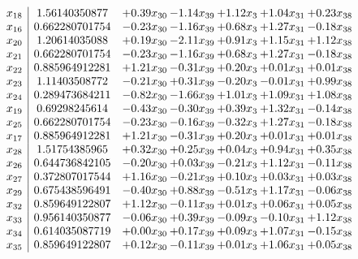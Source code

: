 \documentclass[8pt]{article}
\begin{document}
\[\begin{array}{c| c c@{\hskip 2pt} c@{\hskip 2pt} c@{\hskip 2pt} c@{\hskip 2pt} c@{\hskip 2pt} }
 x_{18}   &  1.56140350877 & +  0.39 x_{30} & -1.14 x_{39} & +  1.12 x_{3} & +  1.04 x_{31} & +  0.23 x_{38}\\
 x_{16}   &  0.662280701754 & -0.23 x_{30} & -1.16 x_{39} & +  0.68 x_{3} & +  1.27 x_{31} & -0.18 x_{38}\\
 x_{20}   &  1.20614035088 & +  0.19 x_{30} & -2.11 x_{39} & +  0.91 x_{3} & +  1.15 x_{31} & +  1.12 x_{38}\\
 x_{21}   &  0.662280701754 & -0.23 x_{30} & -1.16 x_{39} & +  0.68 x_{3} & +  1.27 x_{31} & -0.18 x_{38}\\
 x_{22}   &  0.885964912281 & +  1.21 x_{30} & -0.31 x_{39} & +  0.20 x_{3} & +  0.01 x_{31} & +  0.01 x_{38}\\
 x_{23}   &  1.11403508772 & -0.21 x_{30} & +  0.31 x_{39} & -0.20 x_{3} & -0.01 x_{31} & +  0.99 x_{38}\\
 x_{24}   &  0.289473684211 & -0.82 x_{30} & -1.66 x_{39} & +  1.01 x_{3} & +  1.09 x_{31} & +  1.08 x_{38}\\
 x_{19}   &  0.69298245614 & -0.43 x_{30} & -0.30 x_{39} & +  0.39 x_{3} & +  1.32 x_{31} & -0.14 x_{38}\\
 x_{25}   &  0.662280701754 & -0.23 x_{30} & -0.16 x_{39} & -0.32 x_{3} & +  1.27 x_{31} & -0.18 x_{38}\\
 x_{17}   &  0.885964912281 & +  1.21 x_{30} & -0.31 x_{39} & +  0.20 x_{3} & +  0.01 x_{31} & +  0.01 x_{38}\\
 x_{28}   &  1.51754385965 & +  0.32 x_{30} & +  0.25 x_{39} & +  0.04 x_{3} & +  0.94 x_{31} & +  0.35 x_{38}\\
 x_{26}   &  0.644736842105 & -0.20 x_{30} & +  0.03 x_{39} & -0.21 x_{3} & +  1.12 x_{31} & -0.11 x_{38}\\
 x_{27}   &  0.372807017544 & +  1.16 x_{30} & -0.21 x_{39} & +  0.10 x_{3} & +  0.03 x_{31} & +  0.03 x_{38}\\
 x_{29}   &  0.675438596491 & -0.40 x_{30} & +  0.88 x_{39} & -0.51 x_{3} & +  1.17 x_{31} & -0.06 x_{38}\\
 x_{32}   &  0.859649122807 & +  1.12 x_{30} & -0.11 x_{39} & +  0.01 x_{3} & +  0.06 x_{31} & +  0.05 x_{38}\\
 x_{33}   &  0.956140350877 & -0.06 x_{30} & +  0.39 x_{39} & -0.09 x_{3} & -0.10 x_{31} & +  1.12 x_{38}\\
 x_{34}   &  0.614035087719 & +  0.00 x_{30} & +  0.17 x_{39} & +  0.09 x_{3} & +  1.07 x_{31} & -0.15 x_{38}\\
 x_{35}   &  0.859649122807 & +  0.12 x_{30} & -0.11 x_{39} & +  0.01 x_{3} & +  1.06 x_{31} & +  0.05 x_{38}\\

\end{array}\]
\end{document}
